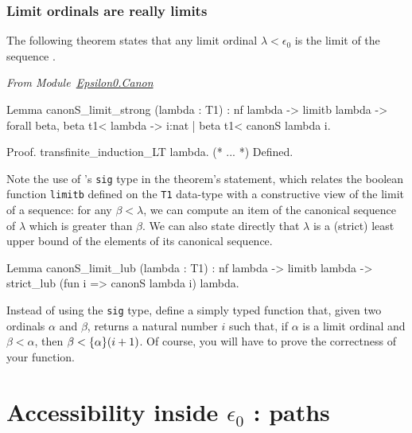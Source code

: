 \documentclass[a4paper]{book}
\begin{document}
\subsubsection{Limit ordinals are really limits}
The following theorem states that any limit ordinal $\lambda<\epsilon_0$ 
is the limit of the sequence .


\vspace{4pt}
\emph{From Module~\href{../src/html/hydras.Epsilon0.Canon.html\#canonS_limit_strong}{Epsilon0.Canon}}


\begin{Coqsrc}
Lemma canonS_limit_strong (lambda : T1) : 
     nf lambda ->
     limitb lambda  ->
     forall beta, beta t1< lambda ->
                  {i:nat | beta t1< canonS lambda i}.

Proof.
  transfinite_induction_LT lambda.
  (* ... *)
Defined.
\end{Coqsrc}

\label{lemma:canonS-limit}


Note the use of \coq's \texttt{sig} type in the theorem's statement, which
relates the boolean function \texttt{limitb} defined on the \texttt{T1} data-type with a constructive view of the limit of a sequence: for any $\beta<\lambda$, we can compute an item of the canonical sequence of $\lambda$ which is greater than $\beta$.
We can also state directly that $\lambda$ is a (strict) least upper bound of the elements of its canonical sequence.


\begin{Coqsrc}
Lemma canonS_limit_lub (lambda : T1) :
  nf lambda -> limitb lambda  ->
  strict_lub (fun i => canonS lambda i) lambda.
\end{Coqsrc}


\begin{exercise}\label{exo:simply-typed-canonseq}
Instead of using the \texttt{sig} type, define a simply typed function that, given two ordinals $\alpha$ and $\beta$, returns a natural number $i$ such that, if $\alpha$ is a limit ordinal and $\beta<\alpha$, then $\beta< \mbox{$\{\alpha\}(i+1)$}$. Of course, you will have to prove the correctness of your function.
\end{exercise}






\section{Accessibility inside \texorpdfstring{$\epsilon_0$}{epsilon0} : paths}
\label{sect:pathes-intro}
\end{document}
